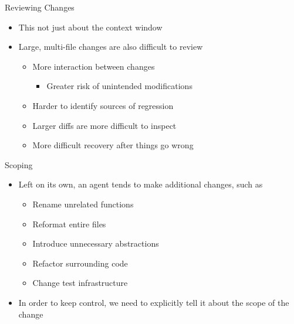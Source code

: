 \documentclass[
ps,
]{prosper}
\begin{document}
\begin{slide}{Reviewing Changes}

\begin{itemize}

\item This not just about the context window

\item Large, multi-file changes are also difficult to review

  \begin{itemize}
    
  \item More interaction between changes

    \begin{itemize}
      
    \item Greater risk of unintended modifications
      
    \end{itemize}

  \item Harder to identify sources of regression

  \item Larger diffs are more difficult to inspect

  \item More difficult recovery after things go wrong
    
  \end{itemize}

\end{itemize}
  
\end{slide}



\begin{slide}{Scoping}

\begin{itemize}

\item Left on its own, an agent tends to make additional changes, such as

  \begin{itemize}

  \item Rename unrelated functions

  \item Reformat entire files

  \item Introduce unnecessary abstractions

  \item Refactor surrounding code

  \item Change test infrastructure
    
  \end{itemize}

\item In order to keep control, we need to explicitly tell it about the scope
  of the change 
  
\end{itemize}
  
\end{slide}
\end{document}
